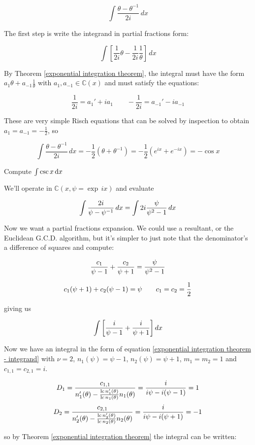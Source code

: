 $$\int \frac{\theta - \theta^{-1}}{2i} \,dx$$

The first step is write the integrand in partial fractions form:

$$\int \left[ \frac{1}{2i} \theta - \frac{1}{2i} \frac{1}{\theta} \right] \,dx $$

By Theorem \ref{exponential integration theorem}, the integral must have the
form $a_1 \theta + a_{-1} \frac{1}{\theta}$ with $a_1, a_{-1} \in {\mathbb
C}(x)$ and must satisfy the equations:

$$\frac{1}{2i} = a_1' + i a_1 \qquad - \frac{1}{2i} = a_{-1}' - i a_{-1}$$ 

These are very simple Risch equations that can be solved by inspection
to obtain $a_1 = a_{-1} = -\frac{1}{2}$, so

$$\int \frac{\theta - \theta^{-1}}{2i} \,dx = -\frac{1}{2}(\theta + \theta^{-1})
 = -\frac{1}{2}(e^{ix} + e^{-ix}) = -\cos x$$

\endexample

\vfill\eject

\example Compute $\int \csc x \, {\rm d}x$

We'll operate in ${\mathbb C}(x, \psi = \exp \,ix)$ and evaluate

$$\int {{2i}\over{\psi - \psi^{-1}}} \,dx = \int 2i {{\psi}\over{\psi^2 - 1}} \,dx$$

Now we want a partial fractions expansion.  We could use a resultant,
or the Euclidean G.C.D. algorithm, but it's simpler to just note that
the denominator's a difference of squares and compute:

$${{c_1}\over{\psi-1}} + {{c_2}\over{\psi+1}} = {{\psi}\over{\psi^2-1}} $$

$${{c_1}(\psi+1)} + {{c_2}(\psi-1)} = \psi \qquad c_1 = c_2 = {1\over2} $$

giving us

$$\int \left[ {{i}\over{\psi-1}} + {{i}\over{\psi+1}} \right] dx$$

Now we have an integral in the form of equation
\eqref{exponential integration theorem - integrand}
with $\nu=2$, $n_1(\psi) = \psi -1$,
$n_2(\psi) = \psi + 1$,
$m_1=m_2=1$ and $c_{1,1} = c_{2,1} = i$.

$$D_{1} = \frac{c_{1,1}}{n_1'(\theta) - \frac{{\rm lc\,} n_1'(\theta)}{{\rm lc\,} n_1(\theta)} n_1(\theta)} = \frac{i}{i \psi - i (\psi-1)} = 1$$
$$D_{2} = \frac{c_{2,1}}{n_2'(\theta) - \frac{{\rm lc\,} n_2'(\theta)}{{\rm lc\,} n_2(\theta)} n_2(\theta)} = \frac{i}{i \psi - i (\psi+1)} = -1$$

so by Theorem \ref{exponential integration theorem}
the integral can be written:

